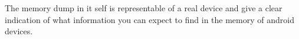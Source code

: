 The memory dump in it self is representable of a real device and give a clear indication of what 
information you can expect to find in the memory of android devices.




